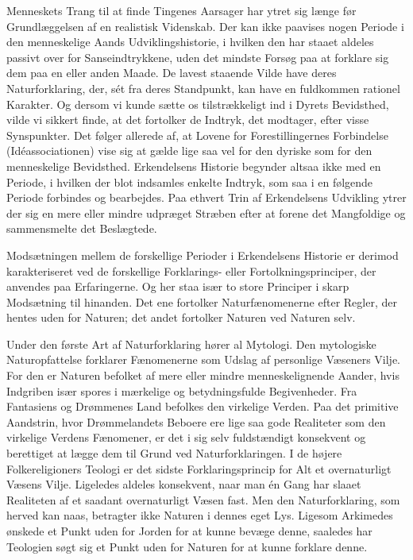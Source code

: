 \documentclass[12pt,a4paper]{article}
\begin{document}
Menneskets Trang til at finde Tingenes Aarsager har ytret sig længe
før Grundlæggelsen af en realistisk Videnskab. Der kan ikke paavises
nogen Periode i den menneskelige Aands Udviklingshistorie, i hvilken
den har staaet aldeles passivt over for Sanseindtrykkene, uden det
mindste Forsøg paa at forklare sig dem paa en eller anden Maade. De
lavest staaende Vilde have deres Naturforklaring, der, sét fra deres
Standpunkt, kan have en fuldkommen rationel Karakter. Og dersom vi
kunde sætte os tilstrækkeligt ind i Dyrets Bevidsthed, vilde vi sikkert
finde, at det fortolker de Indtryk, det modtager, efter visse
Synspunkter. Det følger allerede af, at Lovene for Forestillingernes
Forbindelse (Idéassociationen) vise sig at gælde lige saa vel for den
dyriske som for den menneskelige Bevidsthed. Erkendelsens Historie
begynder altsaa ikke med en Periode, i hvilken der blot indsamles
enkelte Indtryk, som saa i en følgende Periode forbindes og bearbejdes.
Paa ethvert Trin af Erkendelsens Udvikling ytrer der sig en mere eller
mindre udpræget Stræben efter at forene det Mangfoldige og
sammensmelte det Beslægtede.

Modsætningen mellem de forskellige Perioder i Erkendelsens Historie er
derimod karakteriseret ved de forskellige Forklarings- eller
Fortolkningsprinciper, der anvendes paa Erfaringerne. Og her staa
især to store Principer i skarp Modsætning til hinanden. Det ene
fortolker Naturfænomenerne efter Regler, der hentes uden for Naturen;
det andet fortolker Naturen ved Naturen selv.

Under den første Art af Naturforklaring hører al Mytologi. Den
mytologiske Naturopfattelse forklarer Fænomenerne som Udslag af
personlige Væseners Vilje. For den er Naturen befolket af mere eller
mindre menneskelignende Aander, hvis Indgriben især spores i mærkelige
og betydningsfulde Begivenheder. Fra Fantasiens og Drømmenes Land
befolkes den virkelige Verden. Paa det primitive Aandstrin, hvor
Drømmelandets Beboere ere lige saa gode Realiteter som den virkelige
Verdens Fænomener, er det i sig selv fuldstændigt konsekvent og
berettiget at lægge dem til Grund ved Naturforklaringen. I de højere
Folkereligioners Teologi er det sidste Forklaringsprincip for Alt et
overnaturligt Væsens Vilje. Ligeledes aldeles konsekvent, naar man én
Gang har slaaet Realiteten af et saadant overnaturligt Væsen fast. Men
den Naturforklaring, som herved kan naas, betragter ikke Naturen i
dennes eget Lys. Ligesom Arkimedes ønskede et Punkt uden for Jorden
for at kunne bevæge denne, saaledes har Teologien søgt sig et Punkt
uden for Naturen for at kunne forklare denne.
\end{document}
